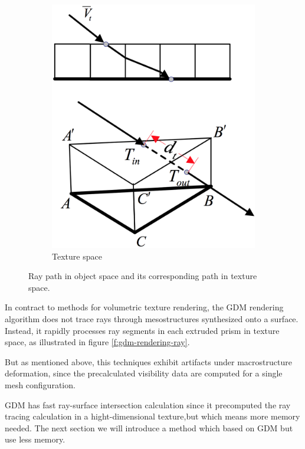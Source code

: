 \begin{figure}
\begin{center}
\begin{subfigure}[b]{0.3\textwidth}
		\includegraphics[width=1.0\textwidth]{graphics/df/GDM-texture-space-ray}	
		\caption{Texture space}
	\end{subfigure}
\end{center}	
\caption{Ray path in object space and its corresponding path in texture space.}
\end{figure}

In contract to methods for volumetric texture rendering, the GDM rendering algorithm does not trace rays through mesostructures synthesized onto a surface. Instead, it rapidly processes ray segments in each extruded prism in texture space, as illustrated in figure \ref{f:gdm-rendering-ray}.

But as mentioned above, this techniques exhibit artifacts under macrostructure deformation, since the precalculated visibility data are computed for a single mesh configuration. 

GDM has fast ray-surface intersection calculation since it precomputed the ray tracing calculation in a hight-dimensional texture,but which means more memory needed. The next section we will introduce a method which based on GDM but use less memory. 



